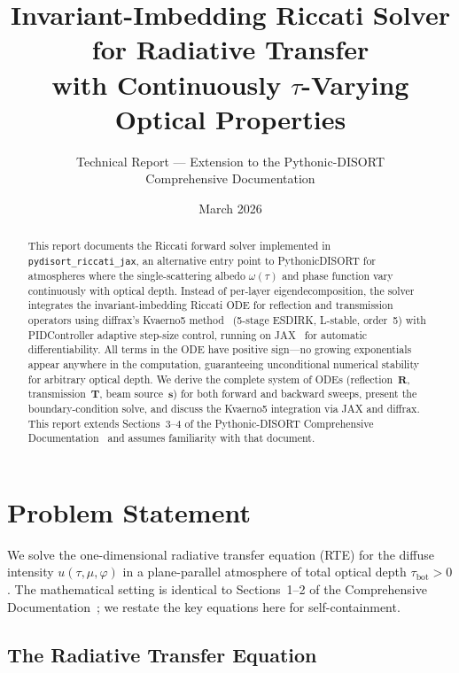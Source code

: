 \documentclass[11pt,a4paper]{article}
\title{Invariant-Imbedding Riccati Solver for Radiative Transfer\\
with Continuously $\tau$-Varying Optical Properties}
\author{Technical Report --- Extension to the Pythonic-DISORT\\
Comprehensive Documentation}
\date{March 2026}
\newcommand{\vect}[1]{\bm{#1}}
\newcommand{\mat}[1]{\mathbf{#1}}
\newcommand{\tbot}{\tau_{\mathrm{bot}}}
\theoremstyle{definition}
\begin{document}
\maketitle

\begin{abstract}
This report documents the Riccati forward solver implemented in
\texttt{pydisort\_riccati\_jax}, an alternative entry point to PythonicDISORT
for atmospheres where the single-scattering albedo $\omega(\tau)$ and
phase function vary continuously with optical depth.  Instead of
per-layer eigendecomposition, the solver integrates the
invariant-imbedding Riccati ODE for reflection and transmission
operators using diffrax's Kvaerno5 method~\cite{kidger2022neural}
(5-stage ESDIRK, L-stable, order~5) with PIDController adaptive
step-size control, running on JAX~\cite{jax2018github} for automatic
differentiability.  All terms in the ODE have positive sign---no growing
exponentials appear anywhere in the computation, guaranteeing
unconditional numerical stability for arbitrary optical depth.  We
derive the complete system of ODEs (reflection~$\mat{R}$,
transmission~$\mat{T}$, beam source~$\vect{s}$) for both forward and
backward sweeps, present the boundary-condition solve, and discuss the
Kvaerno5 integration via JAX and diffrax.  This report extends
Sections~3--4 of the Pythonic-DISORT Comprehensive
Documentation~\cite{HP2024doc} and assumes familiarity with that
document.
\end{abstract}

\tableofcontents
\vspace{1em}

\section{Problem Statement}\label{sec:problem}

We solve the one-dimensional radiative transfer equation (RTE) for the
diffuse intensity $u(\tau, \mu, \varphi)$ in a plane-parallel atmosphere
of total optical depth $\tbot > 0$.  The mathematical setting is
identical to Sections~1--2 of the Comprehensive
Documentation~\cite{HP2024doc}; we restate the key equations here for
self-containment.

\subsection{The Radiative Transfer Equation}
\end{document}
